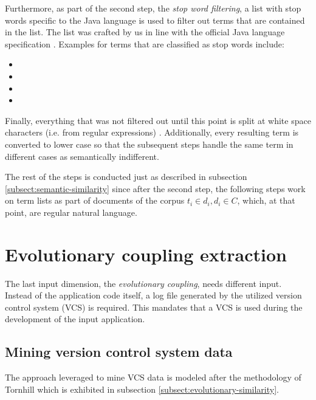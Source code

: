 \documentclass[12pt,a4paper]{report}
\begin{document}
Furthermore, as part of the second step, the \textit{stop word filtering},
a list with stop words specific to the Java language is used to filter out
terms that are contained in the list. The list was crafted by us in line with
the official Java language specification \cite{oracle-java11}.
Examples for terms that are classified as stop words include:
\begin{itemize}[noitemsep]
  \item {}
  \item {}
  \item {}
  \item {}
\end{itemize}

Finally, everything that was not filtered out until this point is split
at white space characters (i.e.  from regular expressions)
\cite{ieee1992posix}.
Additionally, every resulting term is converted to lower case so that
the subsequent steps handle the same term in different cases as
semantically indifferent.

The rest of the steps is conducted just as described in subsection
\ref{subsect:semantic-similarity} since after the second step,
the following steps work on term lists as part of documents of the corpus
\(t_i \in d_i, d_i \in C\), which, at that point, are regular natural language.



\section{Evolutionary coupling extraction} \label{sect:evolutionary-coupling-extraction}

The last input dimension, the \textit{evolutionary coupling}, needs different
input. Instead of the application code itself, a log file generated by the
utilized version control system (VCS) is required.
This mandates that a VCS is used during the development of the input application.


\subsection{Mining version control system data}

The approach leveraged to mine VCS data is modeled after the methodology of
Tornhill \cite{tornhill2015crimescene} which is exhibited in subsection
\ref{subsect:evolutionary-similarity}.
\end{document}
